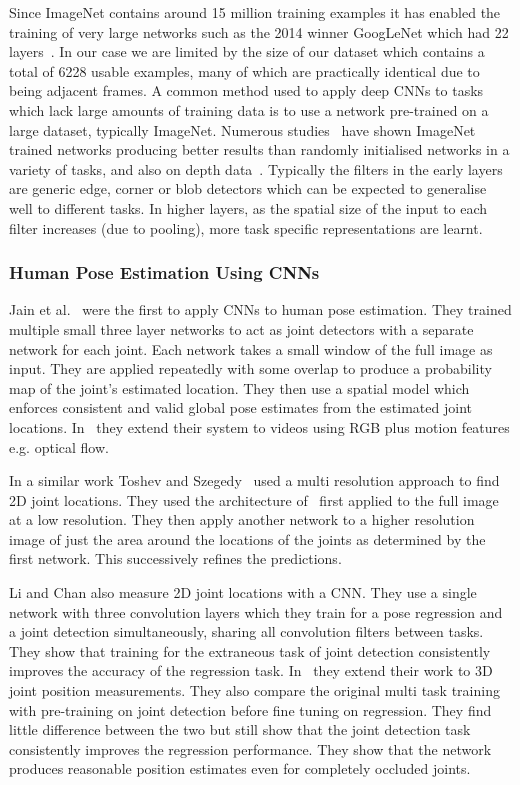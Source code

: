 \documentclass[11pt]{article} %
\begin{document}
Since ImageNet contains around 15 million training examples it has enabled the training of very large networks such as the 2014 winner GoogLeNet which had 22 layers~\cite{Szegedy2014}. In our case we are limited by the size of our dataset which contains a total of 6228 usable examples, many of which are practically identical due to being adjacent frames. A common method used to apply deep CNNs to tasks which lack large amounts of training data is to use a network pre-trained on a large dataset, typically ImageNet. Numerous studies~\cite{Sharif2014,Donahue2014,Oquab2014,Girshick2014,Yosinski2014} have shown ImageNet trained networks producing better results than randomly initialised networks in a variety of tasks, and also on depth data~\cite{Schwarz2015,Alexandre2013}. Typically the filters in the early layers are generic edge, corner or blob detectors which can be expected to generalise well to different tasks. In higher layers, as the spatial size of the input to each filter increases (due to pooling), more task specific representations are learnt. 

\subsubsection{Human Pose Estimation Using CNNs}

\label{sec:HpeCnn} 

Jain et al.~\cite{Jain2013a} were the first to apply CNNs to human pose estimation. They trained multiple small three layer networks to act as joint detectors with a separate network for each joint. Each network takes a small window of the full image as input. They are applied repeatedly with some overlap to produce a probability map of the joint's estimated location. They then use a spatial model which enforces consistent and valid global pose estimates from the estimated joint locations. In~\cite{Jain2014} they extend their system to videos using RGB plus motion features e.g. optical flow. 

In a similar work Toshev and Szegedy~\cite{Toshev} used a multi resolution approach to find 2D joint locations. They used the architecture of~\cite{Krizhevsky2012} first applied to the full image at a low resolution. They then apply another network to a higher resolution image of just the area around the locations of the joints as determined by the first network. This successively refines the predictions. 

Li and Chan also measure 2D joint locations with a CNN. They use a single network with three convolution layers which they train for a pose regression and a joint detection simultaneously, sharing all convolution filters between tasks. They show that training for the extraneous task of joint detection consistently improves the accuracy of the regression task. In~\cite{Accv2014} they extend their work to 3D joint position measurements. They also compare the original multi task training with pre-training on joint detection before fine tuning on regression. They find little difference between the two but still show that the joint detection task consistently improves the regression performance. They show that the network produces reasonable position estimates even for completely occluded joints. 
\end{document}
